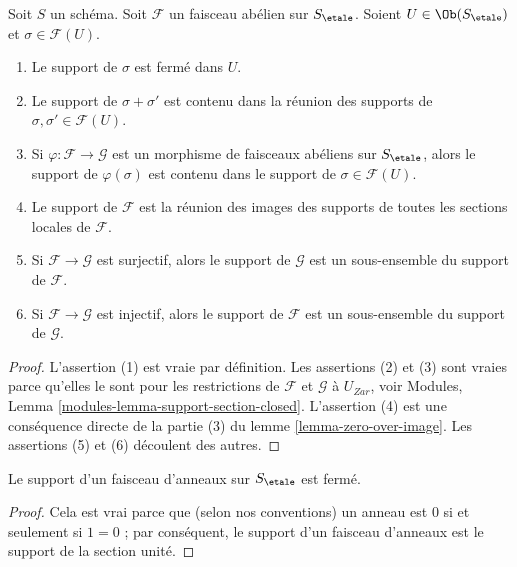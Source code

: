 \begin{lemma}
\label{lemma-support-section-closed}
Soit $S$ un sch\'ema.
Soit $\mathcal{F}$ un faisceau ab\'elien sur $S_\etale$.
Soient $U \in \Ob(S_\etale)$ et $\sigma \in \mathcal{F}(U)$.
\begin{enumerate}
\item Le support de $\sigma$ est ferm\'e dans $U$.
\item Le support de $\sigma + \sigma'$ est contenu dans la r\'eunion des
supports de $\sigma, \sigma' \in \mathcal{F}(U)$.
\item Si $\varphi : \mathcal{F} \to \mathcal{G}$ est un morphisme de
faisceaux ab\'eliens sur $S_\etale$, alors le support de $\varphi(\sigma)$
est contenu dans le support de $\sigma \in \mathcal{F}(U)$.
\item Le support de $\mathcal{F}$ est la r\'eunion des images des
supports de toutes les sections locales de $\mathcal{F}$.
\item Si $\mathcal{F} \to \mathcal{G}$ est surjectif, alors le support
de $\mathcal{G}$ est un sous-ensemble du support de $\mathcal{F}$.
\item Si $\mathcal{F} \to \mathcal{G}$ est injectif, alors le support
de $\mathcal{F}$ est un sous-ensemble du support de $\mathcal{G}$.
\end{enumerate}
\end{lemma}

\begin{proof}
L'assertion (1) est vraie par d\'efinition.
Les assertions (2) et (3) sont vraies parce qu'elles le sont pour les restrictions de
$\mathcal{F}$ et $\mathcal{G}$ \`a $U_{Zar}$, voir
Modules, Lemma \ref{modules-lemma-support-section-closed}.
L'assertion (4) est une cons\'equence directe de la partie (3) du
lemme \ref{lemma-zero-over-image}.
Les assertions (5) et (6) d\'ecoulent des autres.
\end{proof}

\begin{lemma}
\label{lemma-support-sheaf-rings-closed}
Le support d'un faisceau d'anneaux sur $S_\etale$ est ferm\'e.
\end{lemma}

\begin{proof}
Cela est vrai parce que (selon nos conventions)
un anneau est $0$ si et seulement si
$1 = 0$ ; par cons\'equent, le support d'un faisceau d'anneaux
est le support de la section unit\'e.
\end{proof}




